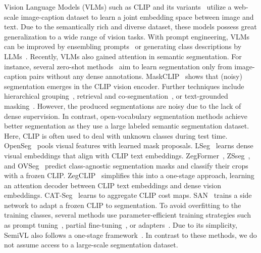 \documentclass[10pt,twocolumn,letterpaper]{article}
\begin{document}
Vision Language Models (VLMs) such as CLIP and its variants~\cite{xclip, maskclip, xclip, naeem2023silc, naeem2023i2mvformer, naeem2022i2dformer} utilize a web-scale image-caption dataset to learn a joint embedding space between image and text.
Due to the semantically rich and diverse dataset,
these models possess great generalization to a wide range of vision tasks\cite{luo2023segclip, cho2023cat, gu2021open, khan2023introducing, wang2022clip, chen2023pali}. With prompt engineering, VLMs can be improved by ensembling prompts~\cite{radford2021learning} or generating class descriptions by LLMs~\cite{naeem2023i2mvformer, cupl}.
Recently, VLMs also gained attention in semantic segmentation.
For instance, several zero-shot methods~\cite{xu2022groupvit,zhou2022extract,shin2022reco,cha2023learning} aim to learn segmentation only from image-caption pairs without any dense annotations. MaskCLIP~\cite{zhou2022extract} shows that (noisy) segmentation emerges in the CLIP vision encoder. Further techniques include hierarchical grouping~\cite{xu2022groupvit}, retrieval and co-segmentation~\cite{shin2022reco}, or text-grounded masking~\cite{cha2023learning}.
However, the produced segmentations are noisy due to the lack of dense supervision. In contrast, open-vocabulary segmentation methods achieve better segmentation as they use a large labeled semantic segmentation dataset. Here, CLIP is often used to deal with unknown classes during test time. OpenSeg~\cite{ghiasi2022scaling} pools visual features with learned mask proposals. LSeg~\cite{li2022languagedriven} learns dense visual embeddings that align with CLIP text embeddings. ZegFormer~\cite{ding2022decoupling}, ZSseg~\cite{xu2022simple}, and OVSeg~\cite{liang2023open} predict class-agnostic segmentation masks and classify their crops with a frozen CLIP.
ZegCLIP~\cite{zhou2023zegclip} simplifies this into a one-stage approach, learning an attention decoder between CLIP text embeddings and dense vision embeddings.
CAT-Seg~\cite{cho2023cat} learns to aggregate CLIP cost maps. SAN~\cite{xu2023side} trains a side network to adapt a frozen CLIP to segmentation. To avoid overfitting to the training classes, several methods use parameter-efficient training strategies such as prompt tuning~\cite{brown2020language,jia2022visual,zhou2022learning,zhou2023zegclip}, partial fine-tuning~\cite{hu2021lora,cho2023cat}, or adapters~\cite{houlsby2019parameter,sung2022vl,xu2023side}. Due to its simplicity, SemiVL also follows a one-stage framework~\cite{zhou2023zegclip,cho2023cat,xu2023side}. 
In contrast to these methods, we do not assume access to a large-scale segmentation dataset.
\end{document}
